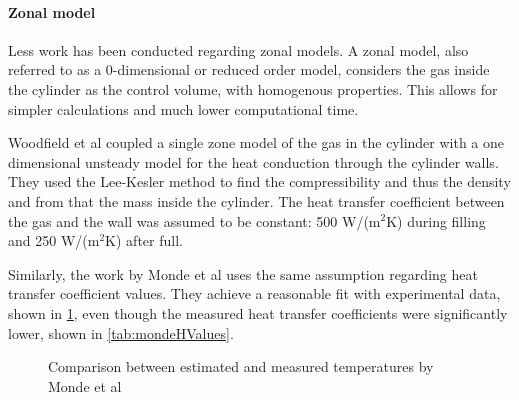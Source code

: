 \paragraph{Zonal model}


Less work has been conducted regarding zonal models. A zonal model, also referred to as a 0-dimensional or reduced order model, considers the gas inside the cylinder as the control volume, with homogenous properties. This allows for simpler calculations and much lower computational time.   

Woodfield et al \cite{Woodfield2008} coupled a single zone model of the gas in the cylinder with a one dimensional unsteady model for the heat conduction through the cylinder walls. They used the Lee-Kesler method \cite{Lee1975} to find the compressibility and thus the density and from that the mass inside the cylinder. The heat transfer coefficient between the gas and the wall was assumed to be constant: 500 W/(m$^2$K) during filling and 250 W/(m$^2$K) after full. 



Similarly, the work by Monde et al \cite{Monde2007} uses the same assumption regarding heat transfer coefficient values.  They achieve a reasonable fit with experimental data, shown in \cref{fig:mondeFit}, even though the measured heat transfer coefficients were significantly lower, shown in \cref{tab:mondeHValues}.

\begin{figure}[H]
\begin{center}
\caption{Comparison between estimated and measured temperatures by Monde et al \cite{Monde2007}}
\label{fig:mondeFit}
\end{center}
\end{figure}

